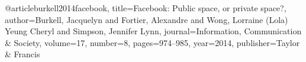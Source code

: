 @article{burkell2014facebook,
  title={Facebook: Public space, or private space?},
  author={Burkell, Jacquelyn and Fortier, Alexandre and Wong, Lorraine (Lola) Yeung Cheryl and Simpson, Jennifer Lynn},
  journal={Information, Communication \& Society},
  volume={17},
  number={8},
  pages={974--985},
  year={2014},
  publisher={Taylor \& Francis}
}
